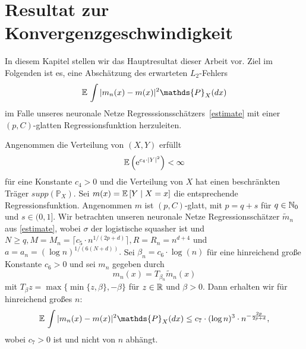 \chapter{Resultat zur Konvergenzgeschwindigkeit}
\label{chap:3}

In diesem Kapitel stellen wir das Hauptresultat dieser Arbeit vor.
Ziel im Folgenden ist es, eine Abschätzung des erwarteten $L_2$-Fehlers 
$$\E \int |m_n(x) - m(x)|^2  \mathds{P}_X(dx)$$
im Falle unseres neuronale Netze Regresssionsschätzers~\ref{estimate} mit einer $(p,C)$-glatten Regressionsfunktion herzuleiten.

\begin{thm}\label{optstop}
Angenommen die Verteilung von $(X,Y)$ erfüllt 
$$ \mathbb{E}\,\Big(\mathrm{e}^{c_4 \cdot |Y|^2}\Big) < \infty$$
für eine Konstante $c_4 > 0$ und die Verteilung von $X$ hat einen beschränkten Träger $supp(\mathds{P}_X)$. Sei $m(x) = \mathbb{E}\,[Y \mid X = x]$ die entsprechende Regressionsfunktion. 
Angenommen $m$ ist $(p,C)$-glatt, mit $p = q + s$ für $q \in \mathbb{N}_0$ und $s \in (0,1].$ Wir betrachten unseren neuronale Netze Regressionsschätzer $\tilde{m}_n$ aus \ref{estimate}, wobei $\sigma$ der logistische squasher ist und $N \geq q, M = M_n = \lceil c_5 \cdot n^{1/(2p + d)}\rceil, R = R_n = n^{d + 4}$ und $a = a_n = (\log n)^{1/(6(N + d))}.$
Sei $\beta_n = c_6 \cdot \log(n)$ für eine hinreichend große Konstante $c_6 > 0$ und sei $m_n$ gegeben durch
$$m_n(x) = T_{\beta_n}\tilde{m}_n (x)$$
mit $T_{\beta}z = \max\{\min\{z, \beta\}, -\beta\}$ für $z \in \mathbb{R}$ und $\beta > 0.$ Dann erhalten wir für hinreichend großes $n$:
$$\E \int |m_n(x) - m(x)|^2  \mathds{P}_X(dx) \leq c_7 \cdot (\log n)^3 \cdot n^{- \frac{2p}{2p + d}},$$
wobei $c_7 > 0$ ist und nicht von $n$ abhängt.
\end{thm}
